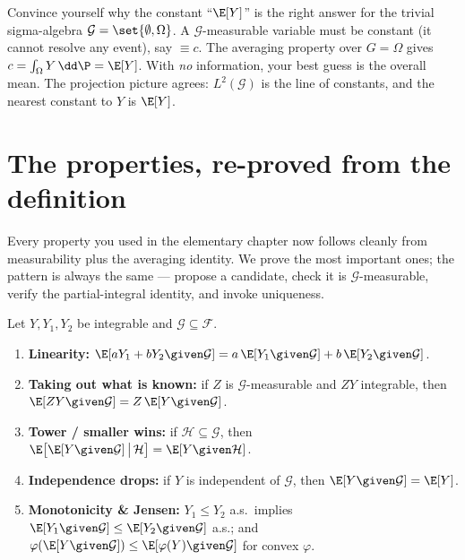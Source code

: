 \begin{walkbox}
Convince yourself why the constant ``$\E[Y]$'' is the right answer for the trivial sigma-algebra
$\mathcal{G} = \set{\emptyset, \Omega}$. A $\mathcal{G}$-measurable variable must be constant
(it cannot resolve any event), say $\equiv c$. The averaging property over $G = \Omega$ gives
$c = \int_\Omega Y\,\dd\P = \E[Y]$. With \emph{no} information, your best guess is the overall mean.
The projection picture agrees: $L^2(\mathcal{G})$ is the line of constants, and the nearest constant
to $Y$ is $\E[Y]$.
\end{walkbox}

\section{The properties, re-proved from the definition}
\label{ch38:properties}

Every property you used in the elementary chapter now follows cleanly from measurability plus the
averaging identity. We prove the most important ones; the pattern is always the same --- propose a
candidate, check it is $\mathcal{G}$-measurable, verify the partial-integral identity, and invoke
uniqueness.

\begin{proposition}
\label{ch38:prop-core}
Let $Y, Y_1, Y_2$ be integrable and $\mathcal{G} \subseteq \mathcal{F}$.
\begin{enumerate}
  \item \textbf{Linearity:} $\E[aY_1 + bY_2 \given \mathcal{G}] = a\,\E[Y_1\given\mathcal{G}] +
    b\,\E[Y_2\given\mathcal{G}]$.
  \item \textbf{Taking out what is known:} if $Z$ is $\mathcal{G}$-measurable and $ZY$ integrable,
    then $\E[ZY \given \mathcal{G}] = Z\,\E[Y\given\mathcal{G}]$.
  \item \textbf{Tower / smaller wins:} if $\mathcal{H} \subseteq \mathcal{G}$, then
    $\E\big[\E[Y\given\mathcal{G}] \,\big|\, \mathcal{H}\big] = \E[Y \given \mathcal{H}]$.
  \item \textbf{Independence drops:} if $Y$ is independent of $\mathcal{G}$, then
    $\E[Y\given\mathcal{G}] = \E[Y]$.
  \item \textbf{Monotonicity \& Jensen:} $Y_1 \le Y_2$ a.s.\ implies $\E[Y_1\given\mathcal{G}] \le
    \E[Y_2\given\mathcal{G}]$ a.s.; and $\varphi(\E[Y\given\mathcal{G}]) \le \E[\varphi(Y)\given
    \mathcal{G}]$ for convex $\varphi$.
\end{enumerate}
\end{proposition}

